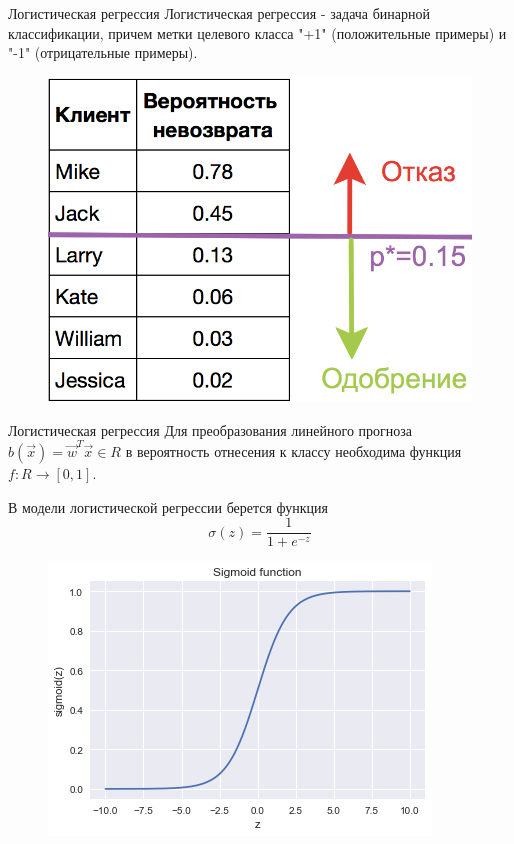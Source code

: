 \documentclass{beamer}
\begin{document}
\begin{frame}[fragile]{Логистическая регрессия}
Логистическая регрессия - задача бинарной классификации, причем метки целевого класса "+1" (положительные примеры) и "-1" (отрицательные примеры).
\begin{figure}[h]
\centering
\includegraphics[scale=0.3]{images/logistic-02.png}
\end{figure}
\end{frame}

\begin{frame}[fragile]{Логистическая регрессия}
Для преобразования линейного прогноза $b(\vec{x})=\vec{w}^T\vec{x} \in R$ в вероятность отнесения к классу необходима функция $f: R\rightarrow[0,1]$.

В модели логистической регрессии берется функция 
\[\sigma(z)=\frac{1}{1+e^{-z}}\]
\begin{figure}[h]
\centering
\includegraphics[scale=0.5]{images/sigmoid.png}
\end{figure}
\end{frame}
\end{document}
